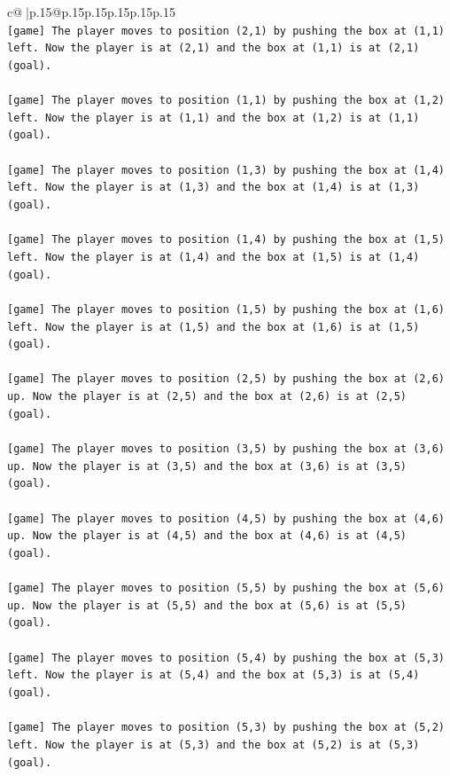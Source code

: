 \documentclass{article}
\begin{document}
{\begin{supertabular}{c@{$\;$}|p{.15\linewidth}@{}p{.15\linewidth}p{.15\linewidth}p{.15\linewidth}p{.15\linewidth}p{.15\linewidth}}
{{{\\ 
\texttt{{[}game{]} The player moves to position (2,1) by pushing the box at (1,1) left. Now the player is at (2,1) and the box at (1,1) is at (2,1) (goal).} \\
\\ 
\texttt{{[}game{]} The player moves to position (1,1) by pushing the box at (1,2) left. Now the player is at (1,1) and the box at (1,2) is at (1,1) (goal).} \\
\\ 
\texttt{{[}game{]} The player moves to position (1,3) by pushing the box at (1,4) left. Now the player is at (1,3) and the box at (1,4) is at (1,3) (goal).} \\
\\ 
\texttt{{[}game{]} The player moves to position (1,4) by pushing the box at (1,5) left. Now the player is at (1,4) and the box at (1,5) is at (1,4) (goal).} \\
\\ 
\texttt{{[}game{]} The player moves to position (1,5) by pushing the box at (1,6) left. Now the player is at (1,5) and the box at (1,6) is at (1,5) (goal).} \\
\\ 
\texttt{{[}game{]} The player moves to position (2,5) by pushing the box at (2,6) up. Now the player is at (2,5) and the box at (2,6) is at (2,5) (goal).} \\
\\ 
\texttt{{[}game{]} The player moves to position (3,5) by pushing the box at (3,6) up. Now the player is at (3,5) and the box at (3,6) is at (3,5) (goal).} \\
\\ 
\texttt{{[}game{]} The player moves to position (4,5) by pushing the box at (4,6) up. Now the player is at (4,5) and the box at (4,6) is at (4,5) (goal).} \\
\\ 
\texttt{{[}game{]} The player moves to position (5,5) by pushing the box at (5,6) up. Now the player is at (5,5) and the box at (5,6) is at (5,5) (goal).} \\
\\ 
\texttt{{[}game{]} The player moves to position (5,4) by pushing the box at (5,3) left. Now the player is at (5,4) and the box at (5,3) is at (5,4) (goal).} \\
\\ 
\texttt{{[}game{]} The player moves to position (5,3) by pushing the box at (5,2) left. Now the player is at (5,3) and the box at (5,2) is at (5,3) (goal).} \\
}}}
\end{supertabular}}
\end{document}
